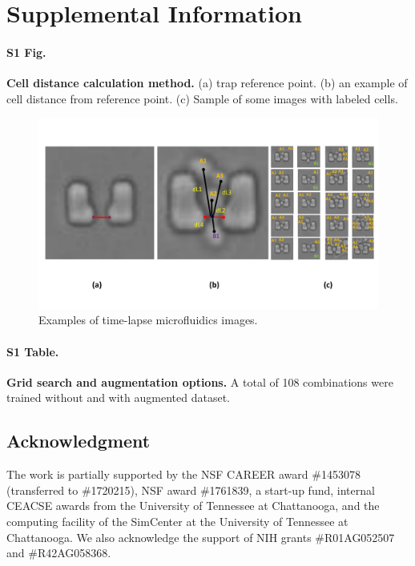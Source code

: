 \documentclass[conference]{IEEEtran}
\begin{document}
\section{Supplemental Information}

\paragraph*{S1 Fig.}
\label{S1_Fig}
{\bf  Cell distance calculation method.} (a) trap reference point. (b) an example of cell distance from reference point. (c) Sample of some images with labeled cells. 


\begin{figure}
\centering
\includegraphics[width=\textwidth,height=10 cm]{Patterns/point.pdf}
\caption{ Examples of time-lapse microfluidics images.}
\label{fig:imageData}
\end{figure} 



\paragraph*{S1 Table.}


\label{S1_Table}
{\bf Grid search and augmentation options.} A total of 108 combinations were trained without and with augmented dataset. 


\subsection*{Acknowledgment}

The work is partially supported by the NSF CAREER award \#1453078 (transferred to \#1720215), NSF award \#1761839, a  start-up fund, internal CEACSE awards from the University of Tennessee at Chattanooga, and the computing facility of the SimCenter at the University of Tennessee at Chattanooga. We also acknowledge the support of NIH grants \#R01AG052507 and \#R42AG058368.
\end{document}
